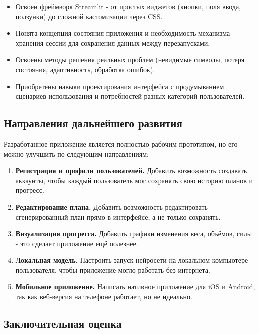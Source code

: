 \documentclass[14pt, a4paper]{extarticle}
\begin{document}
\begin{enumerate}
\begin{itemize}
\item Освоен фреймворк Streamlit - от простых виджетов (кнопки, поля ввода, ползунки) до сложной кастомизации через CSS.

\item Понята концепция состояния приложения и необходимость механизма хранения сессии для сохранения данных между перезапусками.

\item Освоены методы решения реальных проблем (невидимые символы, потеря состояния, адаптивность, обработка ошибок).

\item Приобретены навыки проектирования интерфейса с продумыванием сценариев использования и потребностей разных категорий пользователей.
\end{itemize}
\vskip 5cm
\subsection*{Направления дальнейшего развития}

\noindent Разработанное приложение является полностью рабочим прототипом, но его можно улучшить по следующим направлениям:

\begin{enumerate}
\item \textbf{Регистрация и профили пользователей.} Добавить возможность создавать аккаунты, чтобы каждый пользователь мог сохранять свою историю планов и прогресс.

\item \textbf{Редактирование плана.} Добавить возможность редактировать сгенерированный план прямо в интерфейсе, а не только сохранять.

\item \textbf{Визуализация прогресса.} Добавить графики изменения веса, объёмов, силы - это сделает приложение ещё полезнее.

\item \textbf{Локальная модель.} Настроить запуск нейросети на локальном компьютере пользователя, чтобы приложение могло работать без интернета.

\item \textbf{Мобильное приложение.} Написать нативное приложение для iOS и Android, так как веб-версия на телефоне работает, но не идеально.
\end{enumerate}

\subsection*{Заключительная оценка}


\end{enumerate}
\end{document}
